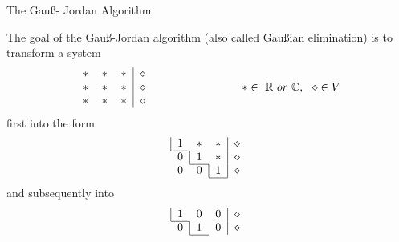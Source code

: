 \documentclass[smaller,hyperref={CJKbookmarks=true}]{beamer}
\newcommand{\C}{\mathbb{C}} \newcommand{\F}{\mathbb{F}} \newcommand{\R}{\mathbb{R}} \newcommand{\Q}{\mathbb{Q}}
\begin{document}
\begin{frame}{The Gau\ss - Jordan Algorithm} \begin{spacing}{1}
The goal of the Gau\ss-Jordan algorithm (also called Gau\ss ian elimination) is to transform a system
\begin{equation*}
  \begin{tabular}{ccc|c}
  $\ast$ & $\ast$ & $\ast$ & $\diamond$ \\
  $\ast$ & $\ast$ & $\ast$ & $\diamond$ \\
  $\ast$ & $\ast$ & $\ast$ & $\diamond$ \\
\end{tabular}
\qquad\qquad\qquad\qquad
 \ast\in~\R~or~\C,~~\diamond\in V
\end{equation*}
first into the form \\
\begin{equation}\label{1.1.2}
\begin{array}{c}
  \begin{tabular}{|ccc|c}
    1 & $\ast$ & $\ast$ & $\diamond$ \\ \cline{1-1}
  \end{tabular} \\
  \begin{tabular}{c|cc|c}
    0 & $1$ & $\ast$ & $\diamond$ \\ \cline{2-2}
  \end{tabular} \\
  \begin{tabular}{cc|c|c}
    0 & $0$ & $1$ & $\diamond$ \\
    \cline{3-3}
  \end{tabular}
\end{array}
\end{equation}
and subsequently into \\[4pt]
\begin{equation}\label{1.1.3}
\begin{array}{c}
  \begin{tabular}{|ccc|c}
    1 & $0$ & $0$ & $\diamond$ \\ \cline{1-1}
  \end{tabular} \\
  \begin{tabular}{c|cc|c}
    0 & $1$ & $0$ & $\diamond$ \\ \cline{2-2}
  \end{tabular} \\
  \begin{tabular}{cc|c|c}

\end{tabular}
\end{array}
\end{equation}
\end{spacing}
\end{frame}
\end{document}
